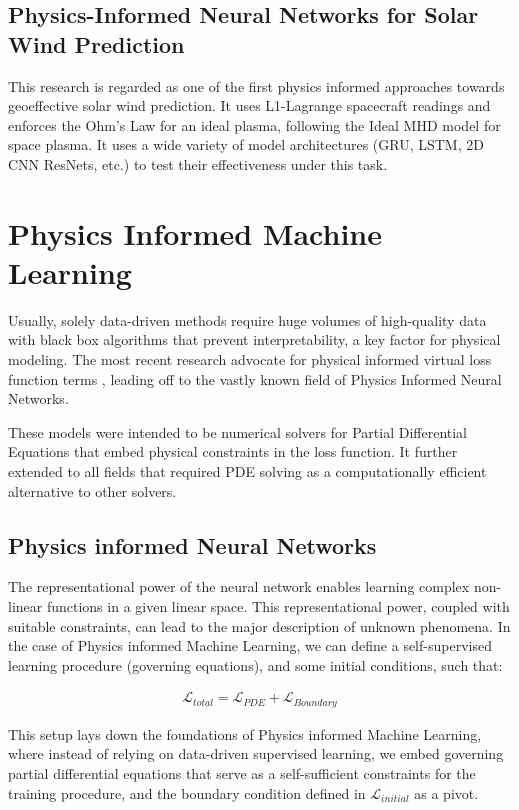 \documentclass[12pt]{article}
\begin{document}
\subsection{Physics-Informed Neural Networks for Solar Wind Prediction}

This research \cite{johnson2022physics} is regarded as one of the first physics informed approaches towards geoeffective solar wind prediction. It uses L1-Lagrange spacecraft readings and enforces the Ohm's Law for an ideal plasma, following the Ideal MHD model for space plasma. It uses a wide variety of model architectures (GRU, LSTM, 2D CNN ResNets, etc.) to test their effectiveness under this task.

\section{Physics Informed Machine Learning}
Usually, solely data-driven methods require huge volumes of high-quality data with black box algorithms that prevent interpretability, a key factor for physical modeling. The most recent research advocate for physical informed virtual loss function terms \cite{}, leading off to the vastly known field of Physics Informed Neural Networks.

These models were intended to be numerical solvers for Partial Differential Equations that embed physical constraints in the loss function. It further extended to all fields that required PDE solving as a computationally efficient alternative to other solvers.

\subsection{Physics informed Neural Networks}
The representational power of the neural network enables learning complex non-linear functions in a given linear space. This representational power, coupled with suitable constraints, can lead to the major description of unknown phenomena. In the case of Physics informed Machine Learning, we can define a self-supervised learning procedure (governing equations), and some initial conditions, such that:

\begin{align*}
    \mathcal{L}_{total} = \mathcal{L}_{PDE} + \mathcal{L}_{Boundary}
\end{align*}

This setup lays down the foundations of Physics informed Machine Learning, where instead of relying on data-driven supervised learning, we embed governing partial differential equations that serve as a self-sufficient constraints for the training procedure, and the boundary condition defined in $\mathcal{L}_{initial}$ as a pivot.
\end{document}
